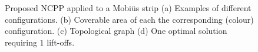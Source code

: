 \documentclass[journal]{IEEEtran}
\begin{document}
\begin{figure}[t]
\centering
{}
\caption{Proposed NCPP applied to a Mobi\"{u}s strip (a) Examples of different configurations. 
(b) Coverable area of each the corresponding (colour) configuration. 
(c) Topological graph (d) One optimal solution requiring $1$ lift-offs. }
\label{fig_mobius_exp}
\end{figure}
\end{document}

